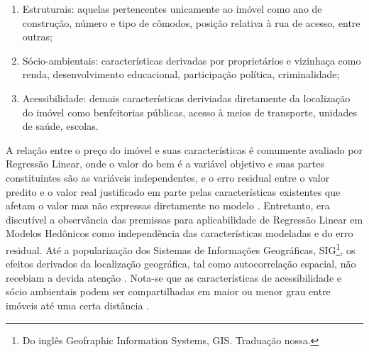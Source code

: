 \begin{enumerate}\label{par:grupo_caracteristicas_imoveis}
\item Estruturais: aquelas pertencentes unicamente ao imóvel como ano de construção, número e tipo de cômodos, posição relativa à rua de acesso, entre outras;

\item Sócio-ambientais: características derivadas por proprietários e vizinhaça como renda, desenvolvimento educacional, participação política, criminalidade;

\item Acessibilidade: demais características deriviadas diretamente da localização do imóvel como benfeitorias públicas, acesso à meios de transporte,  unidades de saúde, escolas.
\end{enumerate}

A relação entre o preço do imóvel e suas características é comumente avaliado por Regressão Linear, onde o valor do bem é a variável objetivo e suas partes constituintes são as variáveis independentes, e o erro residual entre o valor predito e o valor real justificado em parte pelas características existentes que afetam o valor mas não expressas diretamente no modelo \cite[p.4]{Long}. Entretanto, era discutível a observância das premissas para aplicabilidade de Regressão Linear em Modelos Hedônicos como independência das características modeladas e do erro residual. Até a popularização dos Sistemas de Informações Geográficas, SIG\footnote{Do inglês Geofraphic Information Systems, GIS. Traduação nossa.}, os efeitos derivados da localização geográfica, tal como autocorrelação espacial, não recebiam a devida atenção \cite[p.1]{Ismail}. Nota-se que as características de acessibilidade e sócio ambientais podem ser compartilhadas em maior ou menor grau entre imóveis até uma certa distância \cite[p.3]{Ismail}. %


